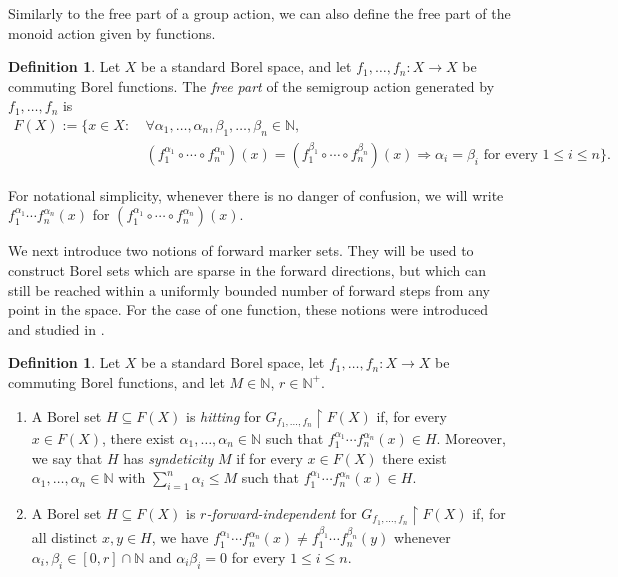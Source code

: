 \documentclass[11pt, reqno, a4paper]{amsart}
\theoremstyle{definition}
\newtheorem{definition}[theorem]{Definition}
\theoremstyle{plain}
\begin{document}
Similarly to the free part of a group action, we can also define the free part of the monoid action given by functions.

\begin{definition}
Let $X$ be a standard Borel space, and let
$f_1,\ldots,f_n:X\to X$
be commuting Borel functions. The \emph{free part} of the semigroup action
generated by $f_1,\ldots,f_n$ is
$$
\begin{aligned}
F(X):=
\bigl\{x\in X:\ &
\forall \alpha_1,\ldots, \alpha_n, \beta_1,\ldots, \beta_n\in\mathbb N,\\
&
(f_1^{\alpha_1}\circ\cdots\circ f_n^{\alpha_n})(x)
=
(f_1^{\beta_1}\circ\cdots\circ f_n^{\beta_n})(x)
\Longrightarrow
\alpha_i=\beta_i
\text{ for every }1\le i\le n
\bigr\}.
\end{aligned}
$$

\end{definition}
For notational simplicity, whenever there is no danger of confusion, we will write $f_1^{\alpha_1}\cdots f_n^{\alpha_n}(x)$ for
$(f_1^{\alpha_1}\circ\cdots\circ f_n^{\alpha_n})(x)$.

We next introduce two notions of forward marker sets. They will be used to construct
Borel sets which are sparse in the forward directions, but which 
can still be reached within a uniformly bounded number of forward steps from any point in the space. For the case of one function, these notions were introduced and studied in \cite{GrebikHiggins2026}.

\begin{definition}
Let $X$ be a standard Borel space, let
$f_1,\ldots,f_n:X\to X$
be commuting Borel functions, and let $M\in\mathbb N$, $r\in\mathbb N^+$. 
\begin{enumerate}
\item A Borel set
$H\subseteq F(X)$ is \emph{hitting} for
$G_{f_1,\ldots,f_n}\upharpoonright F(X)$ if, for every $x\in F(X)$, there exist
$\alpha_1,\ldots, \alpha_n\in\mathbb N$ such that
$f_1^{\alpha_1}\cdots f_n^{\alpha_n}(x)\in H$. Moreover, we say that $H$ has \emph{syndeticity} $M$ if for every $x\in F(X)$ there exist
$\alpha_1,\ldots, \alpha_n\in\mathbb N$ with $\sum_{i=1}^n \alpha_i\leq M$ such that
$f_1^{\alpha_1}\cdots f_n^{\alpha_n}(x)\in H$.
\item
 A Borel set
$H\subseteq F(X)$ is \emph{$r$-forward-independent} for
$G_{f_1,\ldots,f_n}\upharpoonright F(X)$ if, for all distinct $x,y\in H$, we have
$f_1^{\alpha_1}\cdots f_n^{\alpha_n}(x)
\neq
f_1^{\beta_1}\cdots f_n^{\beta_n}(y)$
whenever
$\alpha_i, \beta_i \in [0,r]\cap \mathbb{N}$
and
$\alpha_i\beta_i=0$
for every $1\le i\le n$. 
\end{enumerate}
\end{definition}
\end{document}
